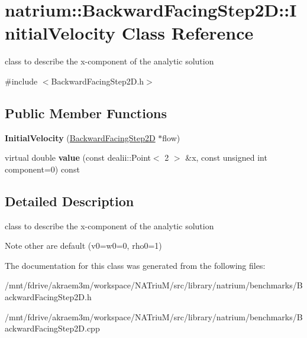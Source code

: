 \hypertarget{classnatrium_1_1BackwardFacingStep2D_1_1InitialVelocity}{
\section{natrium::BackwardFacingStep2D::InitialVelocity Class Reference}
\label{classnatrium_1_1BackwardFacingStep2D_1_1InitialVelocity}
}


class to describe the x-\/component of the analytic solution  


{\ttfamily \#include $<$BackwardFacingStep2D.h$>$}\subsection*{Public Member Functions}
\begin{DoxyCompactItemize}
\item 
\hypertarget{classnatrium_1_1BackwardFacingStep2D_1_1InitialVelocity_af525aeb7c8a33787429b360287a031c2}{
{\bfseries InitialVelocity} (\hyperlink{classnatrium_1_1BackwardFacingStep2D}{BackwardFacingStep2D} $\ast$flow)}
\label{classnatrium_1_1BackwardFacingStep2D_1_1InitialVelocity_af525aeb7c8a33787429b360287a031c2}

\item 
\hypertarget{classnatrium_1_1BackwardFacingStep2D_1_1InitialVelocity_a1b011e5eaf491db88ab46dff2ca8308a}{
virtual double {\bfseries value} (const dealii::Point$<$ 2 $>$ \&x, const unsigned int component=0) const }
\label{classnatrium_1_1BackwardFacingStep2D_1_1InitialVelocity_a1b011e5eaf491db88ab46dff2ca8308a}

\end{DoxyCompactItemize}


\subsection{Detailed Description}
class to describe the x-\/component of the analytic solution \begin{DoxyNote}{Note}
other are default (v0=w0=0, rho0=1) 
\end{DoxyNote}


The documentation for this class was generated from the following files:\begin{DoxyCompactItemize}
\item 
/mnt/fdrive/akraem3m/workspace/NATriuM/src/library/natrium/benchmarks/BackwardFacingStep2D.h\item 
/mnt/fdrive/akraem3m/workspace/NATriuM/src/library/natrium/benchmarks/BackwardFacingStep2D.cpp\end{DoxyCompactItemize}
